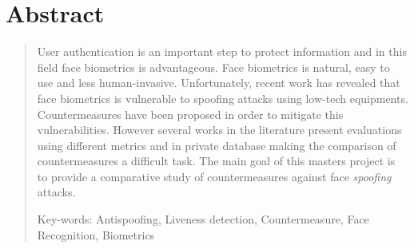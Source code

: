 \chapter*{Abstract}


\begin{quotation}


\noindent User authentication is an important step to protect information and in this field face biometrics is advantageous. Face biometrics is natural, easy to use and less human-invasive. Unfortunately, recent work has revealed that face biometrics is vulnerable to spoofing attacks using low-tech equipments. Countermeasures have been proposed in order to mitigate this vulnerabilities. However several works in the literature present evaluations using different metrics and in private database making the comparison of countermeasures a difficult task. The main goal of this masters project is to provide a comparative study of countermeasures against face \textit{spoofing} attacks.


\vspace*{0.5cm}

\noindent Key-words:  Antispoofing, Liveness detection, Countermeasure, Face Recognition, Biometrics
\newpage%
\end{quotation}

\newpage
\null

